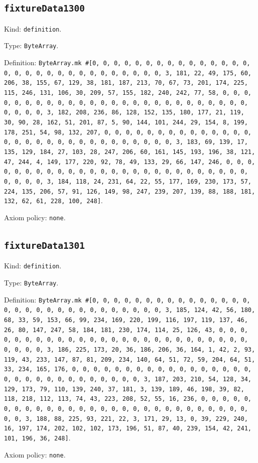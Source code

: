 \documentclass[11pt]{article}
\begin{document}
\subsection*{\texttt{fixtureData1300}}
\noindent Kind: \texttt{definition}.\par
\noindent Type: \texttt{ByteArray}.\par
\noindent Definition: \texttt{ByteArray.mk \#[0, 0, 0, 0, 0, 0, 0, 0, 0, 0, 0, 0, 0, 0, 0, 0, 0, 0, 0, 0, 0, 0, 0, 0, 0, 0, 0, 0, 0, 0, 3, 181, 22, 49, 175, 60, 206, 38, 155, 67, 129, 38, 181, 187, 213, 70, 67, 73, 201, 174, 225, 115, 246, 131, 106, 30, 209, 57, 155, 182, 240, 242, 77, 58, 0, 0, 0, 0, 0, 0, 0, 0, 0, 0, 0, 0, 0, 0, 0, 0, 0, 0, 0, 0, 0, 0, 0, 0, 0, 0, 0, 0, 0, 0, 3, 182, 208, 236, 86, 128, 152, 135, 180, 177, 21, 119, 30, 90, 28, 162, 51, 201, 87, 5, 90, 144, 101, 244, 29, 154, 8, 199, 178, 251, 54, 98, 132, 207, 0, 0, 0, 0, 0, 0, 0, 0, 0, 0, 0, 0, 0, 0, 0, 0, 0, 0, 0, 0, 0, 0, 0, 0, 0, 0, 0, 0, 0, 0, 3, 183, 69, 139, 17, 135, 129, 184, 27, 103, 28, 247, 206, 60, 161, 145, 193, 196, 38, 121, 47, 244, 4, 149, 177, 220, 92, 78, 49, 133, 29, 66, 147, 246, 0, 0, 0, 0, 0, 0, 0, 0, 0, 0, 0, 0, 0, 0, 0, 0, 0, 0, 0, 0, 0, 0, 0, 0, 0, 0, 0, 0, 0, 0, 3, 184, 118, 24, 231, 64, 22, 55, 177, 169, 230, 173, 57, 224, 135, 206, 57, 91, 126, 149, 98, 247, 239, 207, 139, 88, 188, 181, 132, 62, 61, 228, 100, 248]}.\par
\noindent Axiom policy: \texttt{none}.\par
\subsection*{\texttt{fixtureData1301}}
\noindent Kind: \texttt{definition}.\par
\noindent Type: \texttt{ByteArray}.\par
\noindent Definition: \texttt{ByteArray.mk \#[0, 0, 0, 0, 0, 0, 0, 0, 0, 0, 0, 0, 0, 0, 0, 0, 0, 0, 0, 0, 0, 0, 0, 0, 0, 0, 0, 0, 0, 0, 3, 185, 124, 42, 56, 180, 68, 33, 59, 153, 66, 99, 234, 169, 220, 199, 116, 197, 119, 137, 46, 26, 80, 147, 247, 58, 184, 181, 230, 174, 114, 25, 126, 43, 0, 0, 0, 0, 0, 0, 0, 0, 0, 0, 0, 0, 0, 0, 0, 0, 0, 0, 0, 0, 0, 0, 0, 0, 0, 0, 0, 0, 0, 0, 3, 186, 225, 173, 20, 36, 186, 206, 36, 164, 1, 42, 2, 93, 119, 43, 233, 147, 87, 81, 209, 234, 140, 64, 51, 72, 59, 204, 64, 51, 33, 234, 165, 176, 0, 0, 0, 0, 0, 0, 0, 0, 0, 0, 0, 0, 0, 0, 0, 0, 0, 0, 0, 0, 0, 0, 0, 0, 0, 0, 0, 0, 0, 0, 3, 187, 203, 210, 54, 128, 34, 129, 173, 79, 110, 139, 240, 37, 181, 3, 139, 189, 46, 198, 39, 82, 118, 218, 112, 113, 74, 43, 223, 208, 52, 55, 16, 236, 0, 0, 0, 0, 0, 0, 0, 0, 0, 0, 0, 0, 0, 0, 0, 0, 0, 0, 0, 0, 0, 0, 0, 0, 0, 0, 0, 0, 0, 0, 3, 188, 88, 225, 93, 221, 22, 3, 171, 29, 13, 0, 39, 229, 240, 16, 197, 174, 202, 102, 102, 173, 196, 51, 87, 40, 239, 154, 42, 241, 101, 196, 36, 248]}.\par
\noindent Axiom policy: \texttt{none}.\par
\end{document}
